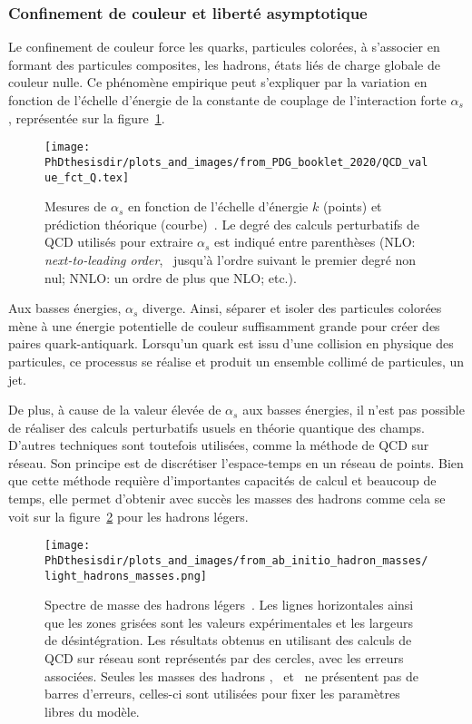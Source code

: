 \subsubsection{Confinement de couleur et liberté asymptotique}\label{chapter-MS-MSSM-section-formalisme-subsec-QCD-subsubsec-confinement}
Le confinement de couleur force les quarks, particules colorées, à s'associer en formant des particules composites, les hadrons, états liés de charge globale de couleur nulle. Ce phénomène empirique peut s'expliquer par la variation en fonction de l'échelle d'énergie de la constante de couplage de l'interaction forte $\alpha_s$, représentée sur la figure~\ref{fig-alpha_s_fct_energy}.
\begin{figure}[h]
\centering
\texttt{[image: \\PhDthesisdir/plots\_and\_images/from\_PDG\_booklet\_2020/QCD\_value\_fct\_Q.tex]}
\caption[Mesure de $\alpha_s$ en fonction de l'échelle d'énergie.]{Mesures de $\alpha_s$ en fonction de l'échelle d'énergie $k$ (points) et prédiction théorique (courbe)~\cite{PDG_booklet_2020}. Le degré des calculs perturbatifs de QCD utilisés pour extraire $\alpha_s$ est indiqué entre parenthèses (NLO: \emph{next-to-leading order}, \ie\ jusqu'à l'ordre suivant le premier degré non nul; NNLO: un ordre de plus que NLO; etc.).}
\label{fig-alpha_s_fct_energy}
\end{figure}
\par Aux basses énergies, $\alpha_s$ diverge.
Ainsi, séparer et isoler des particules colorées mène à une énergie potentielle de couleur suffisamment grande pour créer des paires quark-antiquark. Lorsqu'un quark est issu d'une collision en physique des particules, ce processus se réalise et produit un ensemble collimé de particules, un jet.
\par De plus, à cause de la valeur élevée de $\alpha_s$ aux basses énergies, il n'est pas possible de réaliser des calculs perturbatifs usuels en théorie quantique des champs.
D'autres techniques sont toutefois utilisées, comme la méthode de QCD sur réseau. Son principe est de discrétiser l'espace-temps en un réseau de points. Bien que cette méthode requière d'importantes capacités de calcul et beaucoup de temps, elle permet d'obtenir avec succès les masses des hadrons comme cela se voit sur la figure~\ref{fig-lattice_QCD_masses} pour les hadrons légers.
\begin{figure}[h]
\centering
\texttt{[image: \\PhDthesisdir/plots\_and\_images/from\_ab\_initio\_hadron\_masses/light\_hadrons\_masses.png]}
\caption[Spectre de masse des hadrons légers.]{Spectre de masse des hadrons légers~\cite{ab_initio_hadron_masses}. Les lignes horizontales ainsi que les zones grisées sont les valeurs expérimentales et les largeurs de désintégration. Les résultats obtenus en utilisant des calculs de QCD sur réseau sont représentés par des cercles, avec les erreurs associées. Seules les masses des hadrons \pion, \Kaon\ et \Xibaryon\ ne présentent pas de barres d'erreurs, celles-ci sont utilisées pour fixer les paramètres libres du modèle.}
\label{fig-lattice_QCD_masses}
\end{figure}
